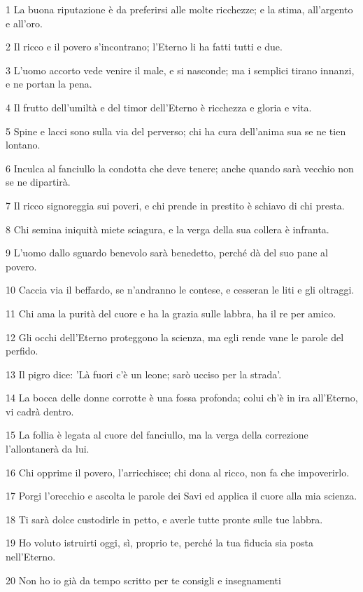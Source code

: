 \par 1 La buona riputazione è da preferirsi alle molte ricchezze; e la stima, all'argento e all'oro.
\par 2 Il ricco e il povero s'incontrano; l'Eterno li ha fatti tutti e due.
\par 3 L'uomo accorto vede venire il male, e si nasconde; ma i semplici tirano innanzi, e ne portan la pena.
\par 4 Il frutto dell'umiltà e del timor dell'Eterno è ricchezza e gloria e vita.
\par 5 Spine e lacci sono sulla via del perverso; chi ha cura dell'anima sua se ne tien lontano.
\par 6 Inculca al fanciullo la condotta che deve tenere; anche quando sarà vecchio non se ne dipartirà.
\par 7 Il ricco signoreggia sui poveri, e chi prende in prestito è schiavo di chi presta.
\par 8 Chi semina iniquità miete sciagura, e la verga della sua collera è infranta.
\par 9 L'uomo dallo sguardo benevolo sarà benedetto, perché dà del suo pane al povero.
\par 10 Caccia via il beffardo, se n'andranno le contese, e cesseran le liti e gli oltraggi.
\par 11 Chi ama la purità del cuore e ha la grazia sulle labbra, ha il re per amico.
\par 12 Gli occhi dell'Eterno proteggono la scienza, ma egli rende vane le parole del perfido.
\par 13 Il pigro dice: 'Là fuori c'è un leone; sarò ucciso per la strada'.
\par 14 La bocca delle donne corrotte è una fossa profonda; colui ch'è in ira all'Eterno, vi cadrà dentro.
\par 15 La follia è legata al cuore del fanciullo, ma la verga della correzione l'allontanerà da lui.
\par 16 Chi opprime il povero, l'arricchisce; chi dona al ricco, non fa che impoverirlo.
\par 17 Porgi l'orecchio e ascolta le parole dei Savi ed applica il cuore alla mia scienza.
\par 18 Ti sarà dolce custodirle in petto, e averle tutte pronte sulle tue labbra.
\par 19 Ho voluto istruirti oggi, sì, proprio te, perché la tua fiducia sia posta nell'Eterno.
\par 20 Non ho io già da tempo scritto per te consigli e insegnamenti
